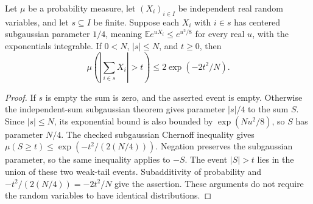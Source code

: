 \begin{lemma}
Let $\mu$ be a probability measure, let $(X_i)_{i\in I}$ be independent
real random variables, and let $s\subseteq I$ be finite. Suppose each
$X_i$ with $i\in s$ has centered subgaussian parameter $1/4$, meaning
$\mathbb E e^{uX_i}\leq e^{u^2/8}$ for every real $u$, with the
exponentials integrable. If $0<N$, $|s|\leq N$, and $t\geq0$, then
\[
 \mu\left(\left|\sum_{i\in s}X_i\right|>t\right)
 \leq 2\exp(-2t^2/N).
\]
\end{lemma}
\begin{proof}
If $s$ is empty the sum is zero, and the asserted event is empty.
Otherwise the independent-sum subgaussian theorem gives parameter
$|s|/4$ to the sum $S$. Since $|s|\leq N$, its exponential bound is
also bounded by $\exp(Nu^2/8)$, so $S$ has parameter $N/4$.
The checked subgaussian Chernoff inequality gives
$\mu(S\geq t)\leq\exp(-t^2/(2(N/4)))$.
Negation preserves the subgaussian parameter, so the same inequality
applies to $-S$. The event $|S|>t$ lies in the union of these two
weak-tail events. Subadditivity of probability and
$-t^2/(2(N/4))=-2t^2/N$ give the assertion. These arguments do not
require the random variables to have identical distributions.
\end{proof}
